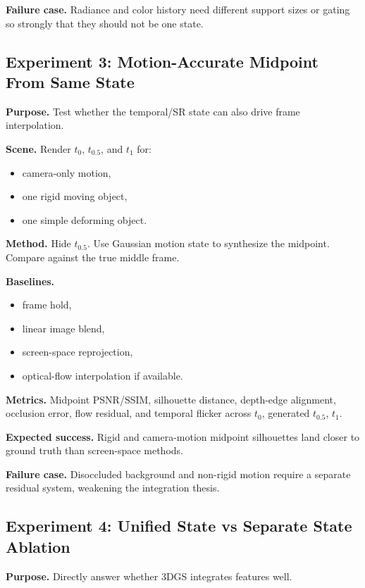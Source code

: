 \documentclass[11pt]{article}
\begin{document}
\textbf{Failure case.} Radiance and color history need different support sizes
or gating so strongly that they should not be one state.

\subsection{Experiment 3: Motion-Accurate Midpoint From Same State}

\textbf{Purpose.} Test whether the temporal/SR state can also drive frame
interpolation.

\textbf{Scene.} Render $t_0$, $t_{0.5}$, and $t_1$ for:

\begin{itemize}
  \item camera-only motion,
  \item one rigid moving object,
  \item one simple deforming object.
\end{itemize}

\textbf{Method.} Hide $t_{0.5}$. Use Gaussian motion state to synthesize the
midpoint. Compare against the true middle frame.

\textbf{Baselines.}

\begin{itemize}
  \item frame hold,
  \item linear image blend,
  \item screen-space reprojection,
  \item optical-flow interpolation if available.
\end{itemize}

\textbf{Metrics.} Midpoint PSNR/SSIM, silhouette distance, depth-edge alignment,
occlusion error, flow residual, and temporal flicker across $t_0$, generated
$t_{0.5}$, $t_1$.

\textbf{Expected success.} Rigid and camera-motion midpoint silhouettes land
closer to ground truth than screen-space methods.

\textbf{Failure case.} Disoccluded background and non-rigid motion require a
separate residual system, weakening the integration thesis.

\subsection{Experiment 4: Unified State vs Separate State Ablation}

\textbf{Purpose.} Directly answer whether 3DGS integrates features well.
\end{document}
